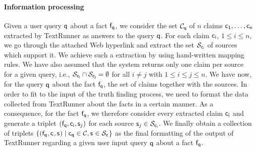 \paragraph*{Information processing}
Given a user query $\mathsf{q}$ about a fact $\mathsf{f}_{\mathsf{q}}$, we consider the set $\mathcal{C}_{\mathsf{q}}$ 
of $n$ claims $\mathsf{c_{1}}, \ldots, \mathsf{c_{n}}$ extracted by TextRunner as answers to the query $\mathsf{q}$.
For each claim $\mathsf{c_{i}}$, $1\leq i\leq n$, we go through the attached Web hyperlink and extract the set
$\mathcal{S}_{\mathsf{c_{i}}}$ of sources which support it. We achieve such a extraction by using hand-written mapping 
rules. We have also assumed that the system returns only one claim per source for a given query, i.e., $\mathcal{S}_{\mathsf{c_{i}}}
\cap \mathcal{S}_{\mathsf{c_{j}}}=\emptyset$ for all $i\neq j$ with $1\leq i\leq j\leq n$. We have now, for the query
$\mathsf{q}$ about the fact $\mathsf{f}_{\mathsf{q}}$, the set of claims together with the sources. In order to fit to 
the input of the truth finding process, we need to format the data collected from TextRunner about the 
facts in a certain manner. As a consequence, for the fact $\mathsf{f}_{\mathsf{q}}$, we therefore consider every extracted 
claim $\mathsf{c_{i}}$ and generate a triplet $(\mathsf{f}_{\mathsf{q}}, \mathsf{c_{i}}, \mathsf{s}_{j})$ for each source $\mathsf{s}_{j}\in \mathcal{S}_{\mathsf{c_{i}}}$.
We finally obtain a collection of triplets $\{(\mathsf{f}_{\mathsf{q}}, \mathsf{c_{}}, \mathsf{s}_{})\mid \mathsf{c_{\mathsf{q}}}\in \mathcal{C}, \mathsf{s}_{} \in \mathcal{S}_{\mathsf{c_{}}}\}$ 
as the final formatting of the output of TextRunner regarding a given user input query $\mathsf{q}$ about a fact $\mathsf{f}_{\mathsf{q}}$. 



